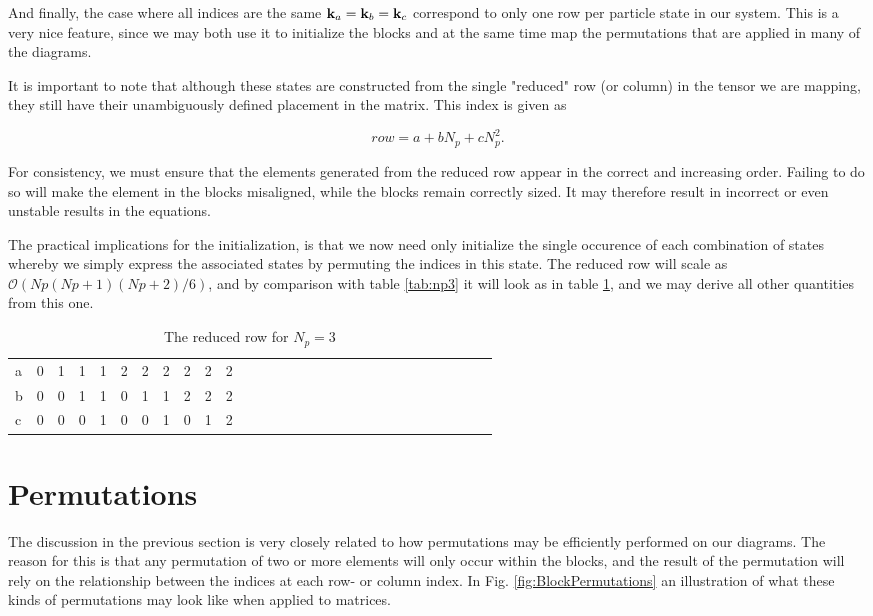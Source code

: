 And finally, the case where all indices are the same $\bold{k}_a = \bold{k}_b = \bold{k}_c$ correspond to only one row per particle state in our system. This is a very nice feature, since we may both use it to initialize the blocks and at the same time map the permutations that are applied in many of the diagrams. 

It is important to note that although these states are constructed from the single "reduced" row (or column) in the tensor we are mapping, they still have their unambiguously defined placement in the matrix. This index is given as 

\begin{equation}
row = a + bN_p + cN_p^2.
\end{equation}

For consistency, we must ensure that the elements generated from the reduced row appear in the correct and increasing order. Failing to do so will make the element in the blocks misaligned, while the blocks remain correctly sized. It may therefore result in incorrect or even unstable results in the equations.


The practical implications for the initialization, is that we now need only initialize the single occurence of each combination of states whereby we simply express the associated states by permuting the indices in this state. The reduced row will scale as $\mathcal{O}(Np(Np+1)(Np+2)/6)$, and by comparison with table \ref{tab:np3} it will look as in table \ref{tab:np32}, and we may derive all other quantities from this one.

\begin{table}[]
\centering
\caption{The reduced row for $N_p = 3$ }
\label{tab:np32}
\begin{tabular}{lllllllllllllllllllllllllllll}
a & 0&  1&  1&  1&  2&  2&  2&  2&  2&  2& \\
b & 0&  0&  1&  1&  0&  1&  1&  2&  2&  2& \\
c & 0&  0&  0&  1&  0&  0&  1&  0&  1&  2& \\
\end{tabular}
\end{table}

\section{Permutations}

The discussion in the previous section is very closely related to how permutations may be efficiently performed on our diagrams. The reason for this is that any permutation of two or more elements will only occur within the blocks, and the result of the permutation will rely on the relationship between the indices at each row- or column index. In Fig. \ref{fig:BlockPermutations} an illustration of what these kinds of permutations may look like when applied to matrices.

